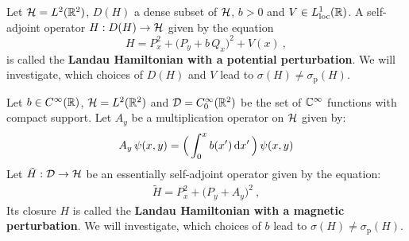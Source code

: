 \begin{defn}
    \label{defn-perturb-potential}
    Let $\mathcal{H} = L^2(\mathbb{R}^2)$, $D(H)$ a dense subset of $\mathcal{H}$, $b>0$ and $V \in L^1_{\text{loc}}(\mathbb{R})$. A self-adjoint operator $H: D(H) \to \mathcal{H}$ given by the equation
    \begin{equation*}
        H
        = P^2_x
        + \big( P_y + b \, Q_x \big)^2
        + V(x)
        \: ,
    \end{equation*}
    is called the \textbf{Landau Hamiltonian with a potential perturbation}. We will investigate, which choices of $D(H)$ and $V$ lead to $\sigma(H) \neq \sigma_{\mathrm{p}}(H)$.
\end{defn}

\begin{defn}
    \label{defn-perturb-magnet}
    Let $b \in C^\infty(\mathbb{R})$, $\mathcal{H} = L^2(\mathbb{R}^2)$ and $\mathcal{D} = C^\infty_0(\mathbb{R}^2)$ be the set of $\mathbb{C}^\infty$ functions with compact support. Let $A_y$ be a multiplication operator on $\mathcal{H}$ given by:
    \begin{align*}
        A_y \, \psi(x, y) = \Big( \int_0^x b(x') \, \mathrm{d}x' \, \Big) \, \psi(x, y)
    \end{align*}
    Let $\tilde H: \mathcal{D} \to \mathcal{H}$ be an essentially self-adjoint operator given by the equation:
    \begin{align*}
        \tilde H = P^2_x + \big( P_y + A_y \big)^2 \: ,
    \end{align*}
    Its closure $H$ is called the \textbf{Landau Hamiltonian with a magnetic perturbation}. We will investigate, which choices of $b$ lead to $\sigma(H) \neq \sigma_{\mathrm{p}}(H)$.
\end{defn}

